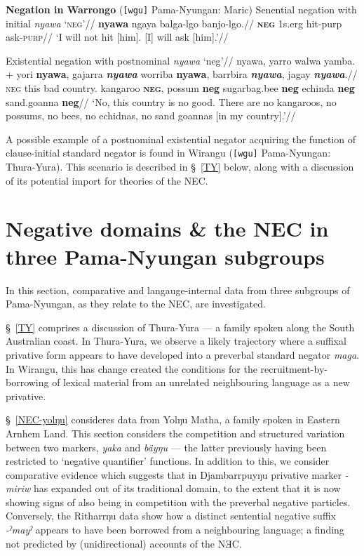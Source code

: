 \pex \textbf{Negation in Warrongo} (\texttt{[wgu]} Pama-Nyungan: Maric)\label{wrg-exx}
\a\begingl\glpreamble Senential negation with initial \textit{nyawa} `\textsc{neg}'//
\gla \textbf{nyawa} ngaya balga-lgo banjo-lgo.//
\glb \textsc{\textbf{neg}} 1\gls{s}.\gls{erg} hit-\gls{purp} ask\textsc{-purp}//
\glft`I will not hit [him]. [I] will ask [him].'//\endgl

\a\begingl\glpreamble Existential negation with postnominal \textit{nyawa} `\gls{neg}'//
\gla nyawa, yarro walwa yamba. + yori \textbf{nyawa}, gajarra \textit{\textbf{nyawa}} worriba \textbf{nyawa}, barrbira \textbf{\textit{nyawa}}, jagay \textbf{\textit{nyawa}}.//
\glb \textsc{neg} this bad country. kangaroo \textsc{\textbf{neg}}, possum \textbf{\gls{neg}} sugarbag.bee \textbf{\gls{neg}} echinda \textbf{\gls{neg}} sand.goanna \textbf{\gls{neg}}//
\glft`No, this country is no good. There are no kangaroos, no possums, no bees, no echidnas, no sand goannas [in my country].'//\endgl
\xe

 A possible example of a postnominal existential negator acquiring the function of clause-initial standard negator is found in Wirangu (\texttt{[wgu]} Pama-Nyungan: Thura-Yura). This scenario is described in \S~\ref{TY} below, along with a discussion of its potential import for theories of the \acrshort{NEC}.

\section{Negative domains \& the \acrshort{NEC} in three Pama-Nyungan subgroups}\label{empirical}

In this section, comparative and langauge-internal data from three subgroups of Pama-Nyungan, as they relate to the \acrlong{NEC}, are investigated.

§~\ref{TY} comprises a discussion of Thura-Yura --- a family spoken along the South Australian coast. In Thura-Yura, we observe a likely trajectory where a suffixal privative form appears to have developed into a preverbal standard negator \textit{maga}. In Wirangu, this has change created the conditions for the recruitment-by-borrowing of lexical material from an unrelated neighbouring language as a new privative.

§~\ref{NEC-yolŋu} consideres data from Yolŋu Matha, a family spoken in Eastern Arnhem Land. This section considers the competition and structured variation between two markers, \textit{yaka} and \textit{bäyŋu} --- the latter previously having been restricted to `negative quantifier' functions. In addition to this, we consider comparative evidence which suggests that in Djambarrpuyŋu privative marker \textit{-miriw} has expanded out of its traditional domain, to the extent that it is now showing signs of also being in competition with the preverbal negative particles. Conversely, the Ritharrŋu data show how a distinct sentential negative suffix \textit{-ˀmayˀ} appears to have been borrowed from a neighbouring language; a finding not predicted by (unidirectional) accounts of the NƎC.

